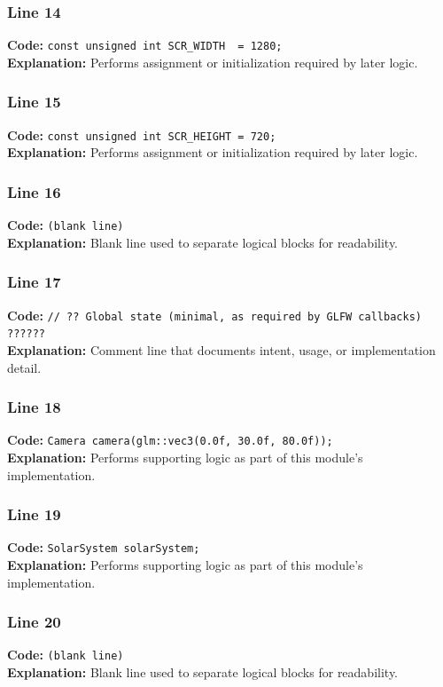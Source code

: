 \documentclass[11pt,a4paper]{article}
\begin{document}
\subsubsection*{Line 14}
\textbf{Code:} \verb|const unsigned int SCR_WIDTH  = 1280;|\\
\textbf{Explanation:} Performs assignment or initialization required by later logic.

\subsubsection*{Line 15}
\textbf{Code:} \verb|const unsigned int SCR_HEIGHT = 720;|\\
\textbf{Explanation:} Performs assignment or initialization required by later logic.

\subsubsection*{Line 16}
\textbf{Code:} \texttt{(blank line)}\\
\textbf{Explanation:} Blank line used to separate logical blocks for readability.

\subsubsection*{Line 17}
\textbf{Code:} \verb|// ?? Global state (minimal, as required by GLFW callbacks) ??????|\\
\textbf{Explanation:} Comment line that documents intent, usage, or implementation detail.

\subsubsection*{Line 18}
\textbf{Code:} \verb|Camera camera(glm::vec3(0.0f, 30.0f, 80.0f));|\\
\textbf{Explanation:} Performs supporting logic as part of this module's implementation.

\subsubsection*{Line 19}
\textbf{Code:} \verb|SolarSystem solarSystem;|\\
\textbf{Explanation:} Performs supporting logic as part of this module's implementation.

\subsubsection*{Line 20}
\textbf{Code:} \texttt{(blank line)}\\
\textbf{Explanation:} Blank line used to separate logical blocks for readability.
\end{document}
